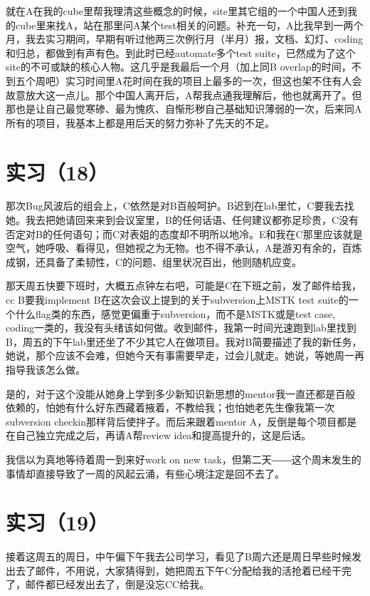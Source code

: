 \documentclass[12pt]{book}
\begin{document}
就在A在我的cube里帮我理清这些概念的时候，site里其它组的一个中国人还到我的cube里来找A，站在那里问A某个test相关的问题。补充一句，A比我早到一两个月，我去实习期间，早期有听过他两三次例行月（半月）报，文档、幻灯、coding和归总，都做到有声有色。到此时已经automate多个test suite，已然成为了这个site的不可或缺的核心人物。这几乎是我最后一个月（加上同B overlap的时间，不到五个周吧）实习时间里A花时间在我的项目上最多的一次，但这也架不住有人会故意放大这一点儿。那个中国人离开后，A帮我点通我理解后，他也就离开了。但那也是让自己最觉寒碜、最为愧疚、自惭形秽自己基础知识薄弱的一次，后来同A所有的项目，我基本上都是用后天的努力弥补了先天的不足。

\section{实习（18）}
\label{sec-5-21}

那次Bug风波后的组会上，C依然是对B百般呵护。B迟到在lab里忙，C要我去找她。我去把她请回来来到会议室里，B的任何话语、任何建议都弥足珍贵，C没有否定对B的任何语句；而C对表姐的态度却不明所以地冷。E和我在C那里应该就是空气，她呼吸、看得见，但她视之为无物。也不得不承认，A是游刃有余的，百炼成钢，还具备了柔韧性，C的问题、组里状况百出，他则随机应变。

那天周五快要下班时，大概五点钟左右吧，可能是C在下班之前，发了邮件给我，cc B要我implement B在这次会议上提到的关于subversion上MSTK test suite的一个什么flag类的东西，感觉更偏重于subversion，而不是MSTK或是test case, coding一类的，我没有头绪该如何做。收到邮件，我第一时间光速跑到lab里找到B，周五的下午lab里还坐了不少其它人在做项目。我对B简要描述了我的新任务，她说，那个应该不会难，但她今天有事需要早走，过会儿就走。她说，等她周一再指导我该怎么做。

是的，对于这个没能从她身上学到多少新知识新思想的mentor我一直还都是百般依赖的，怕她有什么好东西藏着掖着，不教给我；也怕她老先生像我第一次subversion checkin那样背后使拌子。而后来跟着mentor A，反倒是每个项目都是在自己独立完成之后，再请A帮review idea和提高提升的，这是后话。

我信以为真地等待着周一到来好work on new task，但第二天――这个周末发生的事情却直接导致了一周的风起云涌，有些心境注定是回不去了。

\section{实习（19）}
\label{sec-5-22}

接着这周五的周日，中午偏下午我去公司学习，看见了B周六还是周日早些时候发出去了邮件，不用说，大家猜得到，她把周五下午C分配给我的活抢着已经干完了，邮件都已经发出去了，倒是没忘CC给我。
\end{document}
